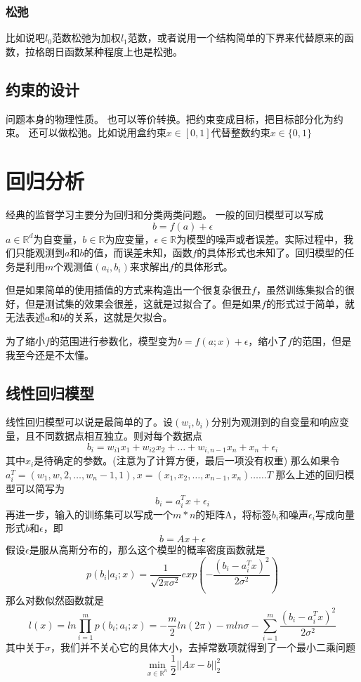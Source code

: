 \documentclass{article}
\begin{document}
\subsubsection{松弛}
比如说吧$l_0$范数松弛为加权$l_1$范数，或者说用一个结构简单的下界来代替原来的函数，拉格朗日函数某种程度上也是松弛。
\subsection{约束的设计}
问题本身的物理性质。
也可以等价转换。把约束变成目标，把目标部分化为约束。
还可以做松弛。比如说用盒约束$x \in [0,1]$代替整数约束$x \in \{0,1\}$

\section{回归分析}
经典的监督学习主要分为回归和分类两类问题。
一般的回归模型可以写成$$b=f(a)+\epsilon$$
$a \in \mathbb{R}^d$为自变量，$b \in \mathbb{R}$为应变量，$\epsilon \in \mathbb{R}$为模型的噪声或者误差。实际过程中，我们只能观测到$a$和$b$的值，而误差未知，函数$f$的具体形式也未知了。回归模型的任务是利用$m$个观测值$(a_i,b_i)$来求解出$f$的具体形式。

但是如果简单的使用插值的方式来构造出一个很复杂很丑$f$，虽然训练集拟合的很好，但是测试集的效果会很差，这就是过拟合了。但是如果$f$的形式过于简单，就无法表述$a$和$b$的关系，这就是欠拟合。

为了缩小$f$的范围进行参数化，模型变为$b=f(a;x)+\epsilon$，缩小了$f$的范围，但是我至今还是不太懂。
\subsection{线性回归模型}
线性回归模型可以说是最简单的了。设$(w_i,b_i)$分别为观测到的自变量和响应变量，且不同数据点相互独立。则对每个数据点
$$
b_i=w_{i1}x_1+w_{i2}x_2+\dots+w_{i,n-1}x_n+x_n+\epsilon_i
$$
其中$x_i$是待确定的参数。(注意为了计算方便，最后一项没有权重)
那么如果令$a_i^T=(w_1,w,2,\dots,w_n-1,1),x=(x_1,x_2,\dots,x_{n-1},x_n)……T$
那么上述的回归模型可以简写为$$b_i=a_i^Tx+\epsilon_i$$
再进一步，输入的训练集可以写成一个$m*n$的矩阵A，将标签$b_i$和噪声$\epsilon_i$写成向量形式$b$和$\epsilon$，即
$$
b=Ax+\epsilon
$$
假设$\epsilon$是服从高斯分布的，那么这个模型的概率密度函数就是
$$
p(b_i|a_i;x)=\frac{1}{\sqrt{2\pi \sigma^2}}exp(-\frac{(b_i-a_i^Tx)^2}{2\sigma^2})
$$
那么对数似然函数就是
$$
l(x)=ln\prod_{i=1}^m p(b_i;a_i;x)=-\frac{m}{2}ln(2\pi)-m ln\sigma-\sum_{i=1}^m \frac{(b_i-a_i^Tx)^2}{2\sigma^2}
$$
其中关于$\sigma$，我们并不关心它的具体大小，去掉常数项就得到了一个最小二乘问题
$$
\min\limits_{x \in \mathbb{R}^n} \frac{1}{2} ||Ax-b||^2_2
$$
\end{document}
